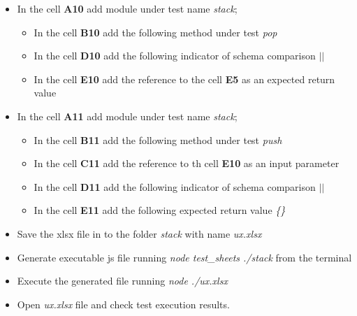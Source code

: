 \begin{itemize}
	\item In the cell \textbf{A10} add  module under test name \textit{stack};
	\begin{itemize}
		\item In the cell \textbf{B10} add the following method under test \textit{pop}
		\item In the cell \textbf{D10} add the following indicator of schema comparison \textit{$||$}
		\item In the cell \textbf{E10} add the reference to the cell \textbf{E5} as an expected return value
	\end{itemize}
	
	\item In the cell \textbf{A11} add  module under test name \textit{stack};
	\begin{itemize}
		\item In the cell \textbf{B11} add the following method under test \textit{push}
		\item In the cell \textbf{C11} add the reference to th cell \textbf{E10} as an input parameter
		\item In the cell \textbf{D11} add the following indicator of schema comparison \textit{$||$}
		\item In the cell \textbf{E11} add the following expected return value \textit{\{\}}
	\end{itemize}
	
	\item Save the xlsx file in to the folder \textit{stack} with name \textit{ux.xlsx}
	
	\item Generate executable js file running \textit{node test\_sheets ./stack} from the terminal
	
	\item Execute the generated file running \textit{node ./ux.xlsx}
	
	\item Open \textit{ux.xlsx} file and check test execution results.
\end{itemize}


